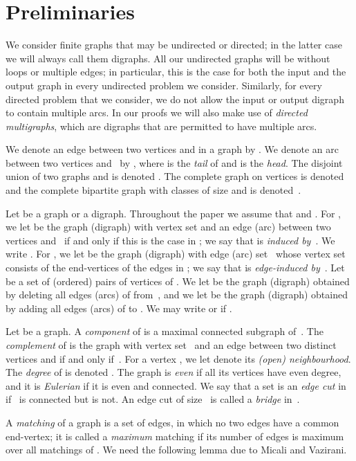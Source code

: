 \documentclass[11pt]{llncs}
\begin{document}
\section{Preliminaries}\label{sec:prelim}

We consider finite graphs  that may be undirected or directed; in the
latter case we will always call them digraphs. All our undirected graphs will
be without loops or multiple edges; in particular, this is the case for both the input and the output graph in every undirected problem we consider. 
Similarly, for every directed problem that we consider, we do not allow the input or output digraph to contain multiple arcs.
In our proofs we will also make use of {\em directed multigraphs}, which are digraphs that are permitted to have multiple arcs.

We denote an edge between two vertices  and  in a graph by .  We denote an arc between
two vertices  and~ by , where  is the \emph{tail} of 
and  is the \emph{head}. The disjoint union of two graphs  and  is denoted .
The complete graph on  vertices is denoted  and the complete bipartite graph with classes of size  and 
is denoted~.

Let  be a graph or a digraph.  Throughout the paper we assume that
 and .  For , we let   be the graph (digraph)
with vertex set  and an edge (arc) between two vertices  and~ if and
only if this is the case in ; we say that  is \emph{induced by}~.
We write .  For , we let  be the
graph (digraph) with edge (arc) set~ whose vertex set consists of the
end-vertices of the edges in ; we say that  is \emph{edge-induced
by}~.  Let  be a set of (ordered) pairs of vertices of .  We let
 be the graph (digraph) obtained by deleting all edges (arcs) of 
from~, and we let  be the graph (digraph) obtained by adding all edges
(arcs) of  to .  We may write  or  if .

Let  be a graph.  A {\em component} of  is a maximal connected subgraph
of~.  The {\em complement}  of   is the graph 
with vertex set~ and an edge between two distinct vertices  and  if and only
if~.   For a vertex , we
let  denote its \emph{(open) neighbourhood}.  The
\emph{degree} of   is denoted . The graph   is {\em even}
if all its vertices have even degree, and it is {\em Eulerian} if it is even
and connected.  We say that a set  is an {\em edge cut} in 
if~ is connected but  is not.  An edge cut of size~ is called a {\em
bridge} in~.

A \emph{matching} of a graph  is a set of edges, in which no two edges have
a common end-vertex; it is called a {\em maximum} matching if its number of
edges is maximum over all matchings of .  We need the following lemma due to
Micali and Vazirani.
\end{document}
